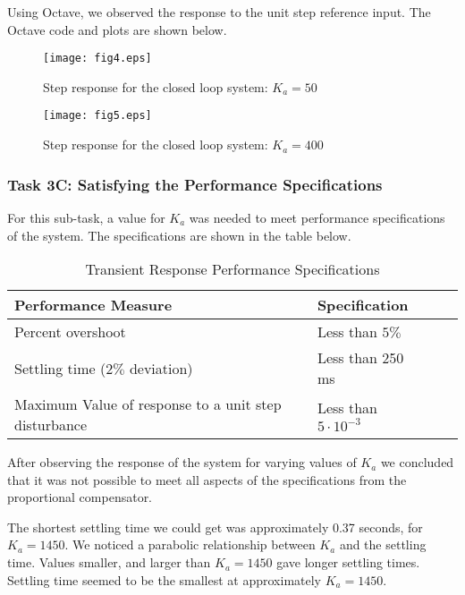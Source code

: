 \documentclass{article}
\newcommand{\matlab}[1]{%
%
}
\begin{document}
Using Octave, we observed the response to the unit step reference input. The
Octave code and plots are shown below. 

\matlab{fig4.m}

\begin{figure}[H]
  \caption{Step response for the closed loop system: $K_a = 50$}
  \centering
  \texttt{[image: fig4.eps]}
\end{figure}

\matlab{fig5.m}

\begin{figure}[H]
  \caption{Step response for the closed loop system: $K_a = 400$}
  \centering
  \texttt{[image: fig5.eps]}
\end{figure}

\subsubsection*{Task 3C: Satisfying the Performance Specifications}

For this sub-task, a value for $K_a$ was needed to meet performance 
specifications of the system. The specifications are shown in the table below.

\begin{table}[H]
\begin{center}
  \begin{tabular}{ | l | l | l | p{5cm} |}
  \hline
  \textbf{Performance Measure} & \textbf{Specification}\\ \hline 
  Percent overshoot & Less than $5\%$ \\ \hline 
  Settling time ($2\%$ deviation) & Less than 250 ms \\ \hline 
  Maximum Value of response to a unit step disturbance & Less than 
  $5\cdot10^{-3}$ \\ \hline 
 \end{tabular}
\end{center}
\caption{Transient Response Performance Specifications}
\end{table}

After observing the response of the system for varying values of $K_a$ we
concluded that it was not possible to meet all aspects of the specifications
from the proportional compensator. 

The shortest settling time we could get was approximately 0.37 seconds, for
$K_a = 1450$. We noticed a parabolic relationship between $K_a$ and the
settling time. Values smaller, and larger than $K_a = 1450$ gave longer
settling times. Settling time seemed to be the smallest at approximately
$K_a = 1450$.
\end{document}
